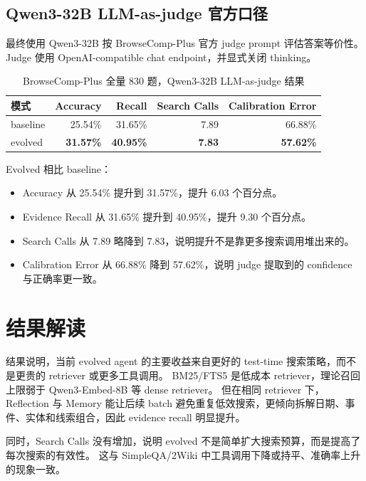 \documentclass[UTF8,a4paper,11pt]{ctexart}
\begin{document}
\subsection{Qwen3-32B LLM-as-judge 官方口径}

最终使用 Qwen3-32B 按 BrowseComp-Plus 官方 judge prompt 评估答案等价性。
Judge 使用 OpenAI-compatible chat endpoint，并显式关闭 thinking。

\begin{table}[h]
\centering
\begin{tabular}{lrrrr}
\toprule
模式 & Accuracy & Recall & Search Calls & Calibration Error \\
\midrule
baseline & 25.54\% & 31.65\% & 7.89 & 66.88\% \\
evolved & \textbf{31.57\%} & \textbf{40.95\%} & \textbf{7.83} & \textbf{57.62\%} \\
\bottomrule
\end{tabular}
\caption{BrowseComp-Plus 全量 830 题，Qwen3-32B LLM-as-judge 结果}
\end{table}

Evolved 相比 baseline：

\begin{itemize}
  \item Accuracy 从 25.54\% 提升到 31.57\%，提升 6.03 个百分点。
  \item Evidence Recall 从 31.65\% 提升到 40.95\%，提升 9.30 个百分点。
  \item Search Calls 从 7.89 略降到 7.83，说明提升不是靠更多搜索调用堆出来的。
  \item Calibration Error 从 66.88\% 降到 57.62\%，说明 judge 提取到的 confidence 与正确率更一致。
\end{itemize}

\section{结果解读}

结果说明，当前 evolved agent 的主要收益来自更好的 test-time 搜索策略，而不是更贵的 retriever 或更多工具调用。
BM25/FTS5 是低成本 retriever，理论召回上限弱于 Qwen3-Embed-8B 等 dense retriever。
但在相同 retriever 下，Reflection 与 Memory 能让后续 batch 避免重复低效搜索，更倾向拆解日期、事件、实体和线索组合，因此 evidence recall 明显提升。

同时，Search Calls 没有增加，说明 evolved 不是简单扩大搜索预算，而是提高了每次搜索的有效性。
这与 SimpleQA/2Wiki 中工具调用下降或持平、准确率上升的现象一致。
\end{document}
